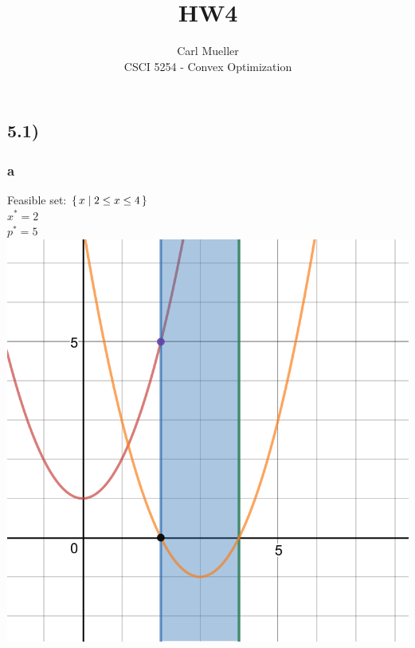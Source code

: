 \documentclass[12pt]{article}
\begin{document}
 
 
 
\title{HW4}
\author{Carl Mueller\\ %
CSCI 5254 - Convex Optimization} %
\maketitle

\subsection*{5.1)}
\subsubsection*{a}
Feasible set: $\set{x|2 \le x \le 4}$\\
$x^* = 2$\\
$p^* = 5$\\
\includegraphics[scale=.25]{1a.png}
\end{document}
